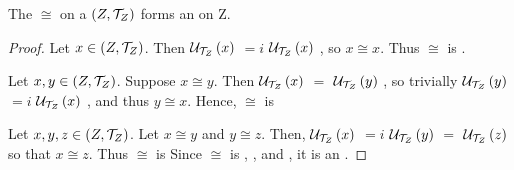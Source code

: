 	
\begin{prop}[\RelationOfEqualNeighborhoodFilters]
    \label{prop:EqualNeighborhoodFiltersEquivalenceRelation}
    
    The
	\RelationOfEqualNeighborhoodFilters
	$\cong$ on a \TopologicalSpace $(Z,\mathcal{T}_Z)$ forms an 
	\EquivalenceRelation	
	on Z. 
    \begin{proof}
        
        Let $x \in (Z,\mathcal{T}_Z)$. 
        Then $\mathcal{U}_{\mathcal{T}_{Z}}\left( x\right)$
        $=i$
        $\mathcal{U}_{\mathcal{T}_{Z}}\left( x\right)$
        , so $x \cong x$.
        Thus $\cong$ is 
		\ReflexiveRelation. 
        
        Let $x,y \in (Z,\mathcal{T}_Z)$. 
        Suppose $x \cong y$. 
        Then  $\mathcal{U}_{\mathcal{T}_{Z}}\left( x\right)$
        $=$
        $\mathcal{U}_{\mathcal{T}_{Z}}\left( y\right)$
        , so trivially  $\mathcal{U}_{\mathcal{T}_{Z}}\left( y\right)$
        $=i$
        $\mathcal{U}_{\mathcal{T}_{Z}}\left( x\right)$
        , and thus $y \cong x$.
        Hence, $\cong$ is 
		\SymmetricRelation
        
        Let $x,y,z \in (Z,\mathcal{T}_Z)$.
        Let $x \cong y$ and $y \cong z$. 
        Then, 
         $\mathcal{U}_{\mathcal{T}_{Z}}\left( x\right)$
         $=i$
         $\mathcal{U}_{\mathcal{T}_{Z}}\left( y\right)$
         $=$
         $\mathcal{U}_{\mathcal{T}_{Z}}\left( z\right)$
         so that $x \cong z$.
         Thus $\cong$ is \TransitiveRelation
         Since $\cong$ is 
		 \ReflexiveRelation
		, \SymmetricRelation
		, and \TransitiveRelation, it is an 
		\EquivalenceRelation. 
        
    \end{proof}
\end{prop}
